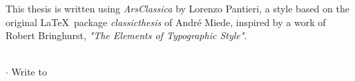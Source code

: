 
\clearpage
{}
\thispagestyle{empty}

\hfill

\vfill


\noindent This thesis is written using \textit{ArsClassica} by Lorenzo Pantieri, a style
based on the original \LaTeX~package \textit{classicthesis} of André Miede,
inspired by a work of Robert Bringhurst, \textit{"The Elements of Typographic
Style"}.
\medskip


\noindent{}\rmfamily\\
\leftpointright	 \href{mailto:\myEmail}{\myEmail}
$\cdot$ Write to \myName
